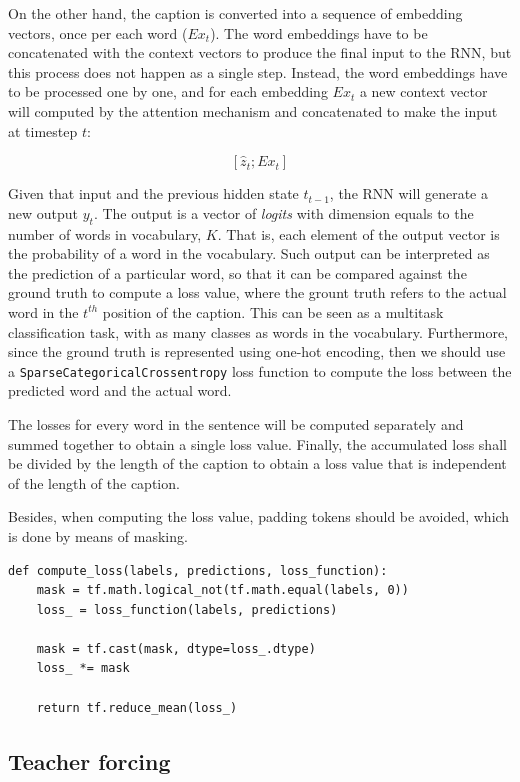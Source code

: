 On the other hand, the caption is converted into a sequence of embedding vectors, once per each word ($Ex_t$).  The word embeddings have to be concatenated with the context vectors to produce the final input to the RNN, but this process does not happen as a single step. Instead, the word embeddings have to be processed one by one, and for each embedding $Ex_t$  a new context vector will computed by the attention mechanism and concatenated to make the input at timestep $t$:

$$[\hat{z}_t;Ex_t]$$

Given that input and the previous hidden state $t_{t-1}$, the RNN will generate a new output $y_t$. The output is a vector of \textit{logits} with dimension equals to the number of words in vocabulary, $K$. That is, each element of the output vector is the probability of a word in the vocabulary. Such output can be interpreted as the prediction of a particular word, so that it can be compared against the ground truth to compute a loss value, where the grount truth refers to the actual word in the $t^{th}$ position of the caption. This can be seen as a multitask classification task, with as many classes as words in the vocabulary. Furthermore, since the ground truth is represented using one-hot encoding, then we should use  a \lstinline{SparseCategoricalCrossentropy} loss function to compute the loss between the predicted word and the actual word.

The losses for every word in the sentence will be computed separately and summed together to obtain a single loss value. Finally, the accumulated loss shall be divided by the length of the caption to obtain a loss value that is independent of the length of the caption.

Besides, when computing the loss value, padding tokens should be avoided, which is done by means of masking. 

\begin{lstlisting}
def compute_loss(labels, predictions, loss_function):
    mask = tf.math.logical_not(tf.math.equal(labels, 0))
    loss_ = loss_function(labels, predictions)

    mask = tf.cast(mask, dtype=loss_.dtype)
    loss_ *= mask

    return tf.reduce_mean(loss_)
\end{lstlisting}


\subsection{Teacher forcing}\label{subsec:teacher_forcing}

